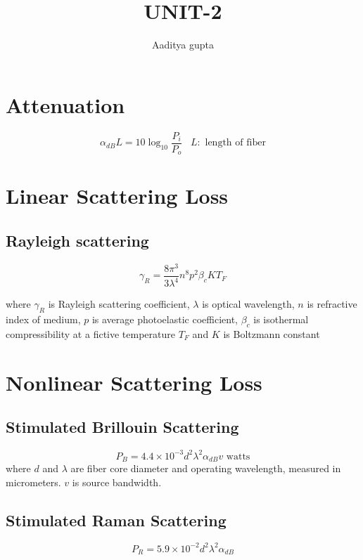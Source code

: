 \documentclass[12pt, onecolumn]{article}
\title{\bf{UNIT-2}}
\author{Aaditya gupta}
\begin{document}
\maketitle

\section{Attenuation}
    \begin{equation}
        \alpha_{dB}L = 10 \log_{10} \frac{P_i}{P_o} \;\;\; L : \text{ length of fiber}
        \label{eq:attenuation}
    \end{equation}

\section{Linear Scattering Loss}
    \subsection{Rayleigh scattering}
        \begin{equation}
            \gamma_R = \displaystyle\frac{8\pi^3}{3\lambda^4}n^8p^2\beta_c K T_F
            \label{eq:rayleigh}
        \end{equation}

        where $ \gamma_R $ is Rayleigh scattering coefficient, $\lambda$ is optical wavelength, $n$ is refractive index of medium,
        $p$ is average photoelastic coefficient, $\beta_c$ is isothermal compressibility at a fictive temperature $T_F$ and $K$ is 
        Boltzmann constant

\section{Nonlinear Scattering Loss}
    \subsection{Stimulated Brillouin Scattering}
        \begin{equation}
            P_B = 4.4 \times 10^{-3} d^2\lambda^2\alpha_{dB}v \text{  watts}
            \label{eq: sbs}
        \end{equation} 
        where $d$ and $\lambda$ are fiber core diameter and operating wavelength, measured in
        micrometers. $v$ is source bandwidth.

    \subsection{Stimulated Raman Scattering}
        \begin{equation}
            P_R = 5.9 \times 10^{-2}d^2\lambda^2\alpha_{dB}
            \label{eq:srs}
        \end{equation}
\end{document}
